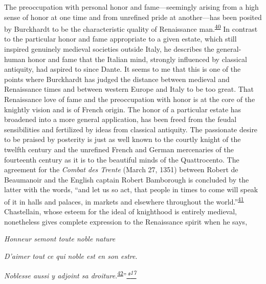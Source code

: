 \protect\hypertarget{10_Chapter_Three__THE_HEROIC_DREAM.xhtmlux5cux23page_74}{}{}The
preoccupation with personal honor and fame---seemingly arising from a
high sense of honor at one time and from unrefined pride at
another---has been posited by Burckhardt to be the characteristic
quality of Renaissance
man.\textsuperscript{\protect\hypertarget{10_Chapter_Three__THE_HEROIC_DREAM.xhtmlux5cux23id_1853}{\protect\hyperlink{23_NOTES.xhtmlux5cux23id_1854}{40}}}
In contrast to the particular honor and fame appropriate to a given
estate, which still inspired genuinely medieval societies outside Italy,
he describes the general-human honor and fame that the Italian mind,
strongly influenced by classical antiquity, had aspired to since Dante.
It seems to me that this is one of the points where Burckhardt has
judged the distance between medieval and Renaissance times and between
western Europe and Italy to be too great. That Renaissance love of fame
and the preoccupation with honor is at the core of the knightly vision
and is of French origin. The honor of a particular estate has broadened
into a more general application, has been freed from the feudal
sensibilities and fertilized by ideas from classical antiquity. The
passionate desire to be praised by posterity is just as well known to
the courtly knight of the twelfth century and the unrefined French and
German mercenaries of the fourteenth century as it is to the beautiful
minds of the Quattrocento. The agreement for the \emph{Combat des
Trente} (March 27, 1351) between Robert de Beaumanoir and the English
captain Robert Bamborough is concluded by the latter with the words,
``and let us so act, that people in times to come will speak of it in
halls and palaces, in markets and elsewhere throughout the
world.''\textsuperscript{\protect\hypertarget{10_Chapter_Three__THE_HEROIC_DREAM.xhtmlux5cux23id_1851}{\protect\hyperlink{23_NOTES.xhtmlux5cux23id_1852}{41}}}
Chastellain, whose esteem for the ideal of knighthood is entirely
medieval, nonetheless gives complete expression to the Renaissance
spirit when he says,

\emph{Honneur semont toute noble nature}

\emph{D'aimer tout ce qui noble est en son estre}.

\emph{Noblesse aussi y adjoint sa
droiture}.\textsuperscript{\protect\hypertarget{10_Chapter_Three__THE_HEROIC_DREAM.xhtmlux5cux23id_1849}{\protect\hyperlink{23_NOTES.xhtmlux5cux23id_1850}{42}}}''\emph{\protect\hypertarget{10_Chapter_Three__THE_HEROIC_DREAM.xhtmlux5cux23id_2495}{\protect\hyperlink{23_NOTES.xhtmlux5cux23id_2496}{*\textsuperscript{17}}}}

